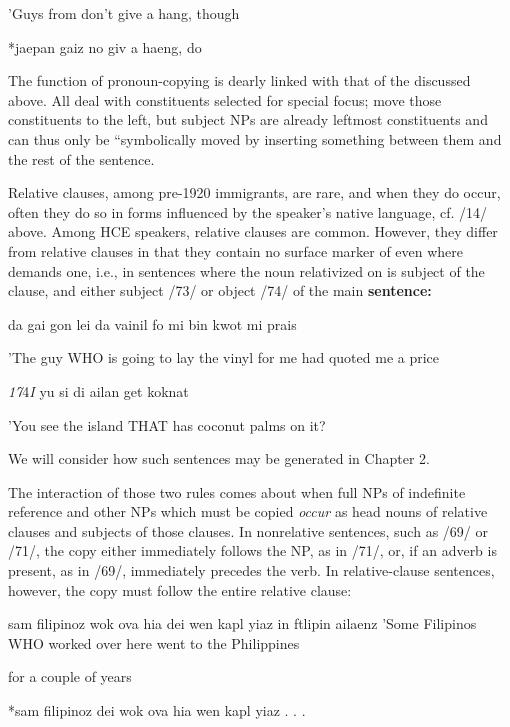 'Guys from  don't give a hang, though

\ea\label{ex:72}
 *jaepan gaiz no giv a haeng, do
\glt
\z

The function of pronoun-copying  is dearly linked with that of the  discussed above. All deal with constituents selected for special focus;  move those constituents to the left, but subject NPs are already leftmost constituents and can thus only be ``symbolically moved by inserting something between them and the rest of the sentence.

Relative clauses, among pre-1920 immigrants, are rare, and when they do occur, often they do so in forms influenced by the speaker's native language, cf. /14/ above. Among HCE speakers, relative clauses are common. However, they differ from  relative clauses in that they contain no surface marker of  even where  demands one, i.e., in sentences where the noun relativized on is sub\-ject of the clause, and either subject /73/ or object /74/ of the main \textbf{sentence:} 

\ea\label{ex:73}
 da gai gon lei da vainil fo mi bin kwot mi prais
\glt
\z

'The guy WHO is going to lay the vinyl for me had quoted me a price

\textit{17}4\textit{I }yu si di ailan get koknat

'You see the island THAT has coconut palms on it?

We will consider how such sentences may be generated in Chapter 2.

The interaction of those two rules comes about when full NPs of indefinite reference and other NPs which must be copied \textit{occur }as head nouns of relative clauses and subjects of those clauses. In non\-relative sentences, such as /69/ or /71/, the copy either immediately follows the NP, as in /71/, or, if an adverb is present, as in /69/, immediately precedes the verb. In relative-clause sentences, however, the copy must follow the entire relative clause:

\ea\label{ex:75}
 sam filipinoz wok ova hia dei wen kapl yiaz in ftlipin ailaenz 'Some Filipinos WHO worked over here went to the Philippines
\glt
\z

for a couple of years

\ea\label{ex:76}
 *sam filipinoz dei wok ova hia wen kapl yiaz . . .
\glt
\z

